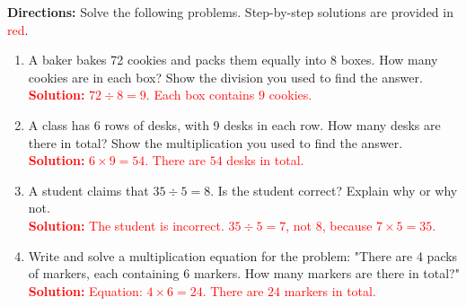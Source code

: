 \documentclass[12pt]{article}
\begin{document}
\begin{tcolorbox}[colframe=black!60, colback=white, 
coltitle=black, colbacktitle=black!15, fonttitle=\bfseries\Large, 
title=Problems, halign title=center, left=10pt, right=10pt, top=10pt, bottom=60pt]
\textbf{Directions:} Solve the following problems. Step-by-step solutions are provided in \textcolor{red}{red}.

\begin{enumerate}[start=17, itemsep=8em]
    \item A baker bakes 72 cookies and packs them equally into 8 boxes. How many cookies are in each box? Show the division you used to find the answer.\\
    \textcolor{red}{\textbf{Solution:} \(72 \div 8 = 9\). Each box contains \(9\) cookies.}
    
    \item A class has 6 rows of desks, with 9 desks in each row. How many desks are there in total? Show the multiplication you used to find the answer.\\
    \textcolor{red}{\textbf{Solution:} \(6 \times 9 = 54\). There are \(54\) desks in total.}
    
    \item A student claims that \(35 \div 5 = 8\). Is the student correct? Explain why or why not.\\
    \textcolor{red}{\textbf{Solution:} The student is incorrect. \(35 \div 5 = 7\), not \(8\), because \(7 \times 5 = 35\).}
    
    \item Write and solve a multiplication equation for the problem: "There are 4 packs of markers, each containing 6 markers. How many markers are there in total?"\\
    \textcolor{red}{\textbf{Solution:} Equation: \(4 \times 6 = 24\). There are \(24\) markers in total.}
\end{enumerate}
\end{tcolorbox}
\end{document}
